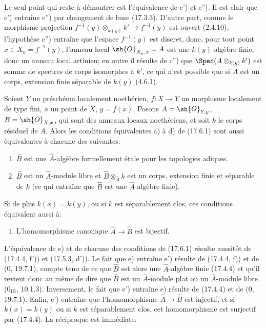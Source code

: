 Le seul point qui reste à démontrer est l'équivalence de c') et c''). Il est clair que c') entraîne c'') par changement de base (17.3.3). D'autre part, comme le morphisme projection $f^{-1}(y)\otimes_{k(y)}k'\to f^{-1}(y)$ est ouvert (2.4.10), l'hypothèse c'') entraîne que l'espace $f^{-1}(y)$ est discret, donc, pour tout point $x\in X_y=f^{-1}(y)$, l'anneau local $\sh{O}_{X_y,x}=A$ est une $k(y)$-algèbre finie, donc un anneau local artinien; en outre il résulte de c'') que $\Spec(A\otimes_{k(y)}k')$ est somme de spectres de corps isomorphes à $k'$, ce qui n'est possible que si $A$ est un corps, extension finie séparable de $k(y)$ (4.6.1).

\begin{proposition}[17.6.3]
\label{IV.17.6.3}
Soient $Y$ un préschéma localement noethérien, $f:X\to Y$ un morphisme localement de type fini, $x$ un point de $X$, $y=f(x)$. Posons $A=\sh{O}_{Y,y}$, $B=\sh{O}_{X,x}$, qui sont des anneaux locaux noethériens, et soit $k$ le corps résiduel de $A$. Alors les conditions équivalentes a) à d) de (17.6.1) sont aussi équivalentes à chacune des suivantes:
\begin{enumerate}
  \item[e)] $\widehat B$ est une $\widehat A$-algèbre formellement étale pour les topologies adiques.
  \item[e')] $\widehat B$ est un $\widehat A$-module libre et $\widehat B\otimes_{\widehat A}k$ est un corps, extension finie et séparable de $k$ (ce qui entraîne que $\widehat B$ est une $\widehat A$-algèbre finie).
\end{enumerate}
Si de plus $k(x)=k(y)$, ou si $k$ est séparablement clos, ces conditions équivalent aussi à:
\begin{enumerate}
  \item[e'')] L'homomorphisme canonique $\widehat A\to\widehat B$ est bijectif.
\end{enumerate}
\end{proposition}

L'équivalence de e) et de chacune des conditions de (17.6.1) résulte aussitôt de (17.4.4, f')) et (17.5.3, d')). Le fait que e) entraîne e') résulte de (17.4.4, f)) et de (0, 19.7.1), compte tenu de ce que $\widehat B$ est alors une $\widehat A$-algèbre finie (17.4.4) et qu'il revient donc au même de dire que $\widehat B$ est un $\widehat A$-module plat ou un $\widehat A$-module libre ($0_{\mathrm{III}}$, 10.1.3). Inversement, le fait que e') entraîne e) résulte de (17.4.4) et de (0, 19.7.1). Enfin, e') entraîne que l'homomorphisme $\widehat A\to\widehat B$ est injectif, et si $k(x)=k(y)$ ou si $k$ est séparablement clos, cet homomorphisme est surjectif par (17.4.4). La réciproque est immédiate.

